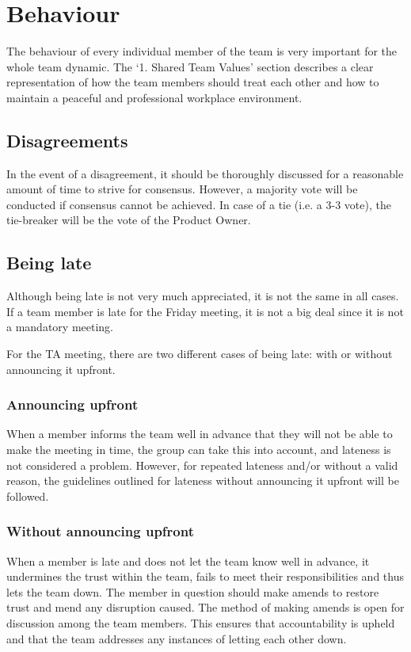 \documentclass[sigconf,nonacm]{acmart}
\begin{document}
\section{Behaviour}
The behaviour of every individual member of the team is very important for the whole team dynamic. The ‘1. Shared Team Values’ section describes a clear representation of how the team members should treat each other and how to maintain a peaceful and professional workplace environment.

\subsection{Disagreements}
In the event of a disagreement, it should be thoroughly discussed for a reasonable amount of time to strive for consensus. However, a majority vote will be conducted if consensus cannot be achieved. In case of a tie (i.e. a 3-3 vote), the tie-breaker will be the vote of the Product Owner.

\subsection{Being late}
Although being late is not very much appreciated, it is not the same in all cases. If a team member is late for the Friday meeting, it is not a big deal since it is not a mandatory meeting.

For the TA meeting, there are two different cases of being late: with or without announcing it upfront.

\subsubsection{Announcing upfront}
When a member informs the team well in advance that they will not be able to make the meeting in time, the group can take this into account, and lateness is not considered a problem. However, for repeated lateness and/or without a valid reason, the guidelines outlined for lateness without announcing it upfront will be followed.

\subsubsection{Without announcing upfront}
When a member is late and does not let the team know well in advance, it undermines the trust within the team, fails to meet their responsibilities and thus lets the team down. The member in question should make amends to restore trust and mend any disruption caused. The method of making amends is open for discussion among the team members. This ensures that accountability is upheld and that the team addresses any instances of letting each other down.
\end{document}
